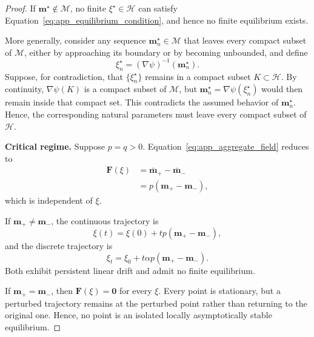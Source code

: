 \documentclass[sigconf,anonymous,review]{acmart}
\theoremstyle{acmdefinition}
\begin{document}
\begin{proof}
If \(\mathbf m^\star\notin\mathcal M\), no finite
\(\xi^\star\in\mathcal H\) can satisfy
Equation~\eqref{eq:app_equilibrium_condition}, and hence no finite
equilibrium exists.

More generally, consider any sequence
\(\mathbf m^\star_n\in\mathcal M\) that leaves every compact subset of
\(\mathcal M\), either by approaching its boundary or by becoming
unbounded, and define
\begin{equation}
    \xi^\star_n
    =
    (\nabla\psi)^{-1}
    \left(
        \mathbf m^\star_n
    \right).
\end{equation}
Suppose, for contradiction, that
\(\{\xi^\star_n\}\) remains in a compact subset
\(K\subset\mathcal H\). By continuity,
\(\nabla\psi(K)\) is a compact subset of \(\mathcal M\), but
\(\mathbf m^\star_n=\nabla\psi(\xi^\star_n)\) would then remain inside
that compact set. This contradicts the assumed behavior of
\(\mathbf m^\star_n\). Hence, the corresponding natural parameters must
leave every compact subset of \(\mathcal H\).

\medskip
\noindent\textbf{Critical regime.}
Suppose \(p=q>0\). Equation~\eqref{eq:app_aggregate_field} reduces to
\begin{equation}
\begin{aligned}
    \mathbf F(\xi)
    &=
    \bar{\mathbf m}_+
    -
    \bar{\mathbf m}_-
    \\
    &=
    p
    \left(
        \mathbf m_+
        -
        \mathbf m_-
    \right),
\end{aligned}
\label{eq:app_critical_field}
\end{equation}
which is independent of \(\xi\).

If \(\mathbf m_+\neq\mathbf m_-\), the continuous trajectory is
\begin{equation}
    \xi(t)
    =
    \xi(0)
    +
    tp
    \left(
        \mathbf m_+
        -
        \mathbf m_-
    \right),
    \label{eq:app_critical_continuous}
\end{equation}
and the discrete trajectory is
\begin{equation}
    \xi_t
    =
    \xi_0
    +
    t\alpha p
    \left(
        \mathbf m_+
        -
        \mathbf m_-
    \right).
    \label{eq:app_critical_discrete}
\end{equation}
Both exhibit persistent linear drift and admit no finite equilibrium.

If \(\mathbf m_+=\mathbf m_-\), then
\(\mathbf F(\xi)=\mathbf 0\) for every \(\xi\). Every point is
stationary, but a perturbed trajectory remains at the perturbed point
rather than returning to the original one. Hence, no point is an
isolated locally asymptotically stable equilibrium.


\end{proof}
\end{document}
